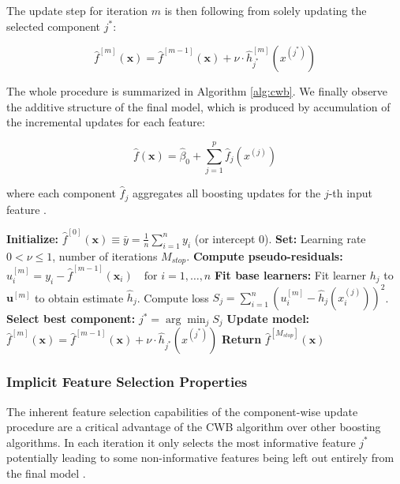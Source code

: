 \documentclass[fontsize=12 pt]{scrartcl}
\begin{document}
The update step for iteration $m$ is then following from solely updating the selected component $j^*$:

\begin{equation}
    \hat{f}^{[m]}(\mathbf{x}) = \hat{f}^{[m-1]}(\mathbf{x}) + \nu \cdot \hat{h}_{j^*}^{[m]}(x^{(j^*)})
\end{equation}

The whole procedure is summarized in Algorithm \ref{alg:cwb}. We finally observe the additive structure of the final model, which is produced by accumulation of the incremental updates for each feature: 

\begin{equation}
\hat{f}(\mathbf{x}) = \hat{\beta}_0 + \sum_{j=1}^p \hat{f}_j(x^{(j)})
\end{equation}

where each component $\hat{f}_j$ aggregates all boosting updates for the $j$-th input feature \citep{hastie2009elements}.

\begin{algorithm}
\caption{Component-wise Gradient Boosting with $L_2$ Loss}
\label{alg:cwb}
\begin{algorithmic}[1]
\State \textbf{Initialize:} $\hat{f}^{[0]}(\mathbf{x}) \equiv \bar{y} = \frac{1}{n}\sum_{i=1}^n y_i$ (or intercept 0).
\State \textbf{Set:} Learning rate $0 < \nu \le 1$, number of iterations $M_{stop}$.
    \State \textbf{Compute pseudo-residuals:} 
    \State \quad $u_i^{[m]} = y_i - \hat{f}^{[m-1]}(\mathbf{x}_i) \quad \text{for } i=1,\dots,n$
    \State \textbf{Fit base learners:}
        \State Fit learner $h_j$ to $\mathbf{u}^{[m]}$ to obtain estimate $\hat{h}_j$.
        \State Compute loss $S_j = \sum_{i=1}^n (u_i^{[m]} - \hat{h}_j(x_i^{(j)}))^2$.
    \EndFor
    \State \textbf{Select best component:}
    \State \quad $j^* = \arg \min_{j} S_j$
    \State \textbf{Update model:}
    \State \quad $\hat{f}^{[m]}(\mathbf{x}) = \hat{f}^{[m-1]}(\mathbf{x}) + \nu \cdot \hat{h}_{j^*}(x^{(j^*)})$
\EndFor
\State \textbf{Return} $\hat{f}^{[M_{stop}]}(\mathbf{x})$
\end{algorithmic}
\end{algorithm}

\subsubsection{Implicit Feature Selection Properties}

The inherent feature selection capabilities of the component-wise update procedure are a critical advantage of the CWB algorithm over other boosting algorithms. In each iteration it only selects the most informative feature $j^*$ potentially leading to some non-informative features being left out entirely from the final model \citep{hofner2014model}.
\end{document}
